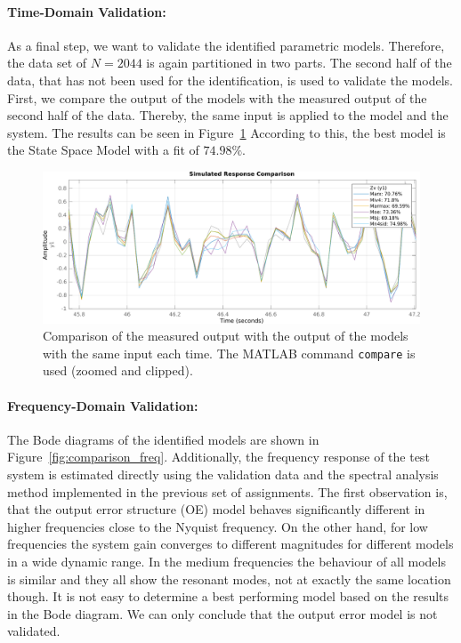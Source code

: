 \paragraph{Time-Domain Validation:}
As a final step, we want to validate the identified parametric models. Therefore, the data set of $N = 2044$ is again partitioned in two parts. 
The second half of the data, that has not been used for the identification, is used to validate the models. 
First, we compare the output of the models with the measured output of the second half of the data.  
Thereby, the same input is applied to the model and the system. 
The results can be seen in Figure~\ref{fig:comparison}
According to this, the best model is the State Space Model with a fit of $74.98 \% $.

\begin{figure}[h]
	\centering
	\includegraphics[width=\textwidth]{figures/time_domain_compare.pdf}
 	\caption{Comparison of the measured output with the output of the models with the same input each time. The MATLAB command \texttt{compare} is used (zoomed and clipped).}
 	\label{fig:comparison}
\end{figure}

\paragraph{Frequency-Domain Validation: } The Bode diagrams of the identified models are shown in Figure~\ref{fig:comparison_freq}.
Additionally, the frequency response of the test system is estimated directly using the validation data and the spectral analysis method implemented in the previous set of assignments.
The first observation is, that the output error structure (OE) model behaves significantly different in higher frequencies close to the Nyquist frequency.
On the other hand, for low frequencies the system gain converges to different magnitudes for different models in a wide dynamic range.
In the medium frequencies the behaviour of all models is similar and they all show the resonant modes, not at exactly the same location though.
It is not easy to determine a best performing model based on the results in the Bode diagram.
We can only conclude that the output error model is not validated.

